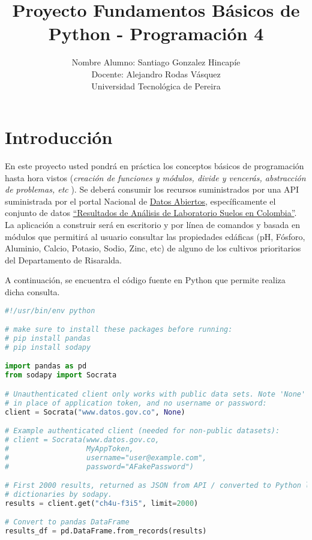 \documentclass[12pt]{article}
\begin{document}
 
 
\title{Proyecto Fundamentos Básicos de Python - Programación 4}
\author{Nombre Alumno: Santiago Gonzalez Hincapíe\\ %
Docente: Alejandro Rodas Vásquez\\
Universidad Tecnológica de Pereira}

\maketitle

\section*{Introducción}
En este proyecto usted pondrá en práctica los conceptos básicos de programación hasta hora vistos (\textit{creación de funciones y módulos, divide y vencerás, abstracción de problemas, etc }). Se deberá consumir los recursos suministrados por una API suministrada por el portal Nacional de \href{https://www.datos.gov.co/}{Datos Abiertos}, específicamente el conjunto de datos \href{https://www.datos.gov.co/Agricultura-y-Desarrollo-Rural/Resultados-de-An-lisis-de-Laboratorio-Suelos-en-Co/ch4u-f3i5}{``Resultados de Análisis de Laboratorio Suelos en Colombia''}.\\


La aplicación a construir será en escritorio y por línea de comandos y basada en módulos que permitirá al usuario consultar las propiedades edáficas (pH, Fósforo, Aluminio, Calcio, Potasio, Sodio, Zinc, etc) de alguno de los cultivos prioritarios del Departamento de Risaralda.\\


\newpage



A continuación, se encuentra el código fuente en Python que permite realiza dicha consulta. 

\begin{lstlisting}[language=Python]
#!/usr/bin/env python

# make sure to install these packages before running:
# pip install pandas
# pip install sodapy

import pandas as pd
from sodapy import Socrata

# Unauthenticated client only works with public data sets. Note 'None'
# in place of application token, and no username or password:
client = Socrata("www.datos.gov.co", None)

# Example authenticated client (needed for non-public datasets):
# client = Socrata(www.datos.gov.co,
#                  MyAppToken,
#                  username="user@example.com",
#                  password="AFakePassword")

# First 2000 results, returned as JSON from API / converted to Python list of
# dictionaries by sodapy.
results = client.get("ch4u-f3i5", limit=2000)

# Convert to pandas DataFrame
results_df = pd.DataFrame.from_records(results)
\end{lstlisting}
\end{document}
